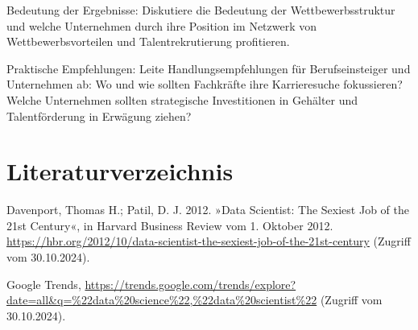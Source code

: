 \documentclass[
]{article}
\begin{document}
Bedeutung der Ergebnisse: Diskutiere die Bedeutung der
Wettbewerbsstruktur und welche Unternehmen durch ihre Position im
Netzwerk von Wettbewerbsvorteilen und Talentrekrutierung profitieren.

Praktische Empfehlungen: Leite Handlungsempfehlungen für
Berufseinsteiger und Unternehmen ab: Wo und wie sollten Fachkräfte ihre
Karrieresuche fokussieren? Welche Unternehmen sollten strategische
Investitionen in Gehälter und Talentförderung in Erwägung ziehen?

\newpage

\section{Literaturverzeichnis}\label{literaturverzeichnis}

Davenport, Thomas H.; Patil, D. J. 2012. »Data Scientist: The Sexiest
Job of the 21st Century«, in Harvard Business Review vom 1. Oktober
2012.
\url{https://hbr.org/2012/10/data-scientist-the-sexiest-job-of-the-21st-century}
(Zugriff vom 30.10.2024).

Google Trends,
\url{https://trends.google.com/trends/explore?date=all&q=\%22data\%20science\%22,\%22data\%20scientist\%22}
(Zugriff vom 30.10.2024).
\end{document}

